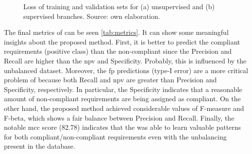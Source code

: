 \begin{figure}[ht]
\centering
{}
\hfill
\ContinuedFloat
{}
\caption{Loss of training and validation sets for (a) unsupervised and (b) supervised branches. Source: own elaboration.}
\label{fig:losses}
\end{figure}

The final metrics of \methodname can be seen \autoref{tab:metrics}. It can show some meaningful insights about the proposed method. First, it is better to predict the compliant requirements (positive class) than the non-compliant since the Precision and Recall are higher than the \acs{npv} and Specificity. Probably, this is influenced by the unbalanced dataset. Moreover, the \acl{fp} predictions (type-I error) are a more critical problem of \methodname because both Recall and \acs{npv} are greater than Precision and Specificity, respectively. In particular, the Specificity indicates that a reasonable amount of non-compliant requirements are being assigned as compliant. On the other hand, the proposed method achieved considerable values of F-measure and F-beta, which shows a fair balance between Precision and Recall. Finally, the notable \acs{mcc} score (82.78) indicates that the \methodname was able to learn valuable patterns for both compliant/non-compliant requirements even with the unbalancing present in the \adhoc database.

